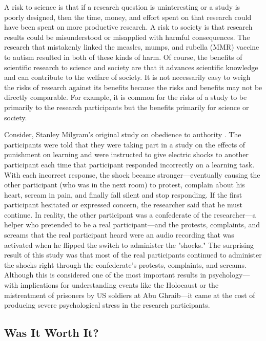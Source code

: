 A risk to science is that if a research question is uninteresting or a study is poorly designed, then the time, money, and effort spent on that research could have been spent on more productive research. A risk to society is that research results could be misunderstood or misapplied with harmful consequences. The research that mistakenly linked the measles, mumps, and rubella (MMR) vaccine to autism resulted in both of these kinds of harm. Of course, the benefits of scientific research to science and society are that it advances scientific knowledge and can contribute to the welfare of society. It is not necessarily easy to weigh the risks of research against its benefits because the risks and benefits may not be directly comparable. For example, it is common for the risks of a study to be primarily to the research participants but the benefits primarily for science or society. 


Consider, Stanley Milgram's original study on obedience to authority \citep{milgram_behavioral_1963}. The participants were told that they were taking part in a study on the effects of punishment on learning and were instructed to give electric shocks to another participant each time that participant responded incorrectly on a learning task. With each incorrect response, the shock became stronger---eventually causing the other participant (who was in the next room) to protest, complain about his heart, scream in pain, and finally fall silent and stop responding. If the first participant hesitated or expressed concern, the researcher said that he must continue. In reality, the other participant was a confederate of the researcher---a helper who pretended to be a real participant---and the protests, complaints, and screams that the real participant heard were an audio recording that was activated when he flipped the switch to administer the "shocks." The surprising result of this study was that most of the real participants continued to administer the shocks right through the confederate's protests, complaints, and screams. Although this is considered one of the most important results in psychology---with implications for understanding events like the Holocaust or the mistreatment of prisoners by US soldiers at Abu Ghraib---it came at the cost of producing severe psychological stress in the research participants.


\subsection{Was It Worth It?}

